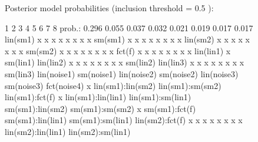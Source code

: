\documentclass[article, shortnames, nojss, noheadings, notitle]{jss}
\begin{document}
\begin{figure}[!htbp]
\begin{small}
\begin{Schunk}
\begin{Soutput}
Posterior model probabilities (inclusion threshold = 0.5 ):
\end{Soutput}
\begin{Soutput}
                       1     2     3     4     5     6     7     8
prob.:             0.296 0.055 0.037 0.032 0.021 0.019 0.017 0.017
lin(sm1)               x     x     x     x     x     x     x     x
sm(sm1)                x     x     x     x     x     x     x     x
lin(sm2)               x     x     x     x     x     x     x     x
sm(sm2)                x     x     x     x     x     x     x     x
fct(f)                 x     x     x     x     x     x     x     x
lin(lin1)                                            x            
sm(lin1)                                                          
lin(lin2)              x     x     x     x     x     x     x     x
sm(lin2)                                                          
lin(lin3)              x     x     x     x     x     x     x     x
sm(lin3)                                                          
lin(noise1)                                                       
sm(noise1)                                                        
lin(noise2)                                                       
sm(noise2)                                                        
lin(noise3)                                                       
sm(noise3)                                                        
fct(noise4)                                                      x
lin(sm1):lin(sm2)                                                 
lin(sm1):sm(sm2)                                                  
lin(sm1):fct(f)                          x                        
lin(sm1):lin(lin1)                                                
lin(sm1):sm(lin1)                                                 
sm(sm1):lin(sm2)                                                  
sm(sm1):sm(sm2)                                            x      
sm(sm1):fct(f)                                                    
sm(sm1):lin(lin1)                                                 
sm(sm1):sm(lin1)                                                  
lin(sm2):fct(f)        x     x     x     x     x     x     x     x
lin(sm2):lin(lin1)                                                
lin(sm2):sm(lin1)                                                 

\end{Soutput}
\end{Schunk}
\end{small}
\end{figure}
\end{document}
